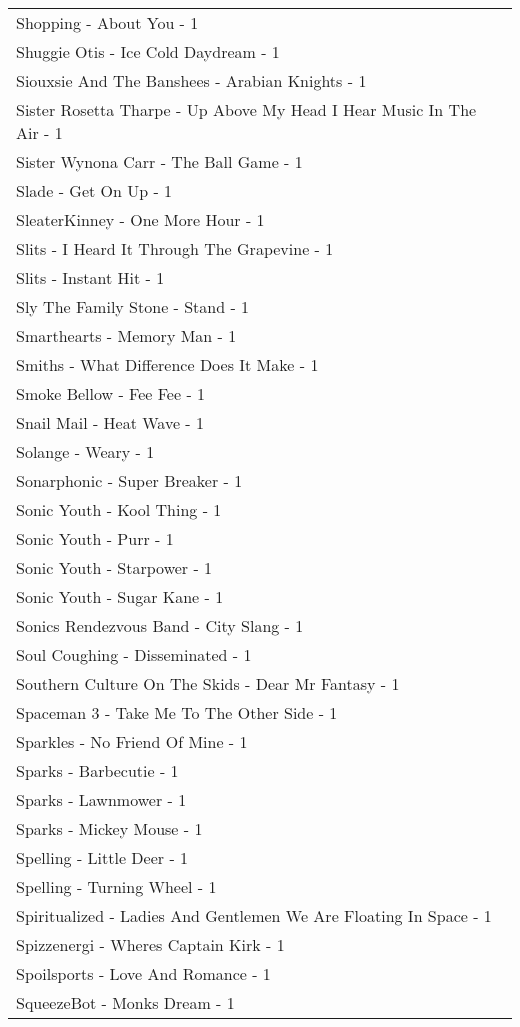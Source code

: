 \documentclass[
]{article}
\begin{document}
\begin{longtable}{l}
Shopping - About You - 1 \\ 
Shuggie Otis - Ice Cold Daydream - 1 \\ 
Siouxsie And The Banshees - Arabian Knights - 1 \\ 
Sister Rosetta Tharpe - Up Above My Head I Hear Music In The Air - 1 \\ 
Sister Wynona Carr - The Ball Game - 1 \\ 
Slade - Get On Up - 1 \\ 
SleaterKinney - One More Hour - 1 \\ 
Slits - I Heard It Through The Grapevine - 1 \\ 
Slits - Instant Hit - 1 \\ 
Sly The Family Stone - Stand - 1 \\ 
Smarthearts - Memory Man - 1 \\ 
Smiths - What Difference Does It Make - 1 \\ 
Smoke Bellow - Fee Fee - 1 \\ 
Snail Mail - Heat Wave - 1 \\ 
Solange - Weary - 1 \\ 
Sonarphonic - Super Breaker - 1 \\ 
Sonic Youth - Kool Thing - 1 \\ 
Sonic Youth - Purr - 1 \\ 
Sonic Youth - Starpower - 1 \\ 
Sonic Youth - Sugar Kane - 1 \\ 
Sonics Rendezvous Band - City Slang - 1 \\ 
Soul Coughing - Disseminated - 1 \\ 
Southern Culture On The Skids - Dear Mr Fantasy - 1 \\ 
Spaceman 3 - Take Me To The Other Side - 1 \\ 
Sparkles - No Friend Of Mine - 1 \\ 
Sparks - Barbecutie - 1 \\ 
Sparks - Lawnmower - 1 \\ 
Sparks - Mickey Mouse - 1 \\ 
Spelling - Little Deer - 1 \\ 
Spelling - Turning Wheel - 1 \\ 
Spiritualized - Ladies And Gentlemen We Are Floating In Space - 1 \\ 
Spizzenergi - Wheres Captain Kirk - 1 \\ 
Spoilsports - Love And Romance - 1 \\ 
SqueezeBot - Monks Dream - 1 \\ 

\end{longtable}
\end{document}
